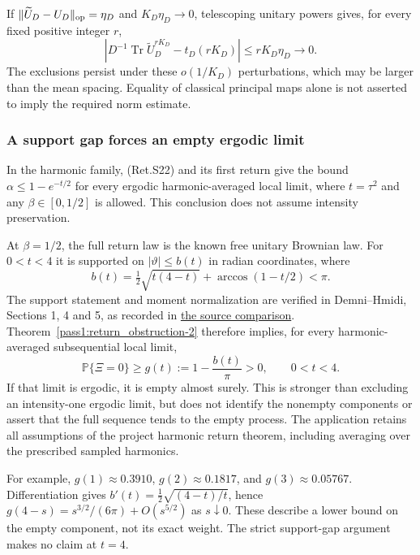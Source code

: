 If \(\|\widetilde U_D-U_D\|_{\rm op}=\eta_D\) and \(K_D\eta_D\to0\), telescoping
unitary powers gives, for every fixed positive integer \(r\),
\[
 |D^{-1}\operatorname{Tr}\widetilde U_D^{rK_D}-t_D(rK_D)|
                            \le rK_D\eta_D\longrightarrow0.     \tag{Ret.S16}
\]
The exclusions persist under these \(o(1/K_D)\) perturbations, which may be
larger than the mean spacing. Equality of classical principal maps alone
is not asserted to imply the required norm estimate.

\hypertarget{a-support-gap-forces-an-empty-ergodic-limit}{%
\subsubsection{A support gap forces an empty ergodic limit}\label{a-support-gap-forces-an-empty-ergodic-limit}}

In the harmonic family, (Ret.S22) and its first return give the bound
\(\alpha\le1-e^{-t/2}\) for every ergodic harmonic-averaged local limit,
where \(t=\tau^2\) and any \(\beta\in[0,1/2]\) is allowed.
This conclusion does not assume intensity preservation.

At \(\beta=1/2\), the full return law is the known free unitary Brownian law.
For \(0<t<4\) it is supported on \(|\vartheta|\le b(t)\) in radian coordinates,
where
\[
 b(t)=\tfrac12\sqrt{t(4-t)}+\arccos(1-t/2)<\pi.
\]
The support statement and moment normalization are verified in Demni--Hmidi,
Sections 1, 4 and 5, as recorded in
\href{https://github.com/ChurilovMaksim/BGS/blob/main/literature/return_local_limits_sources.md}{the source comparison}.
Theorem~\ref{pass1:return_obstruction-2} therefore implies, for every harmonic-averaged subsequential
local limit,
\[
 \mathbb P\{\Xi=0\}\ge
       g(t):=1-\frac{b(t)}{\pi}>0,\qquad 0<t<4.                 \tag{Ret.S24}
\]
If that limit is ergodic, it is empty almost surely. This is stronger than
excluding an intensity-one ergodic limit, but does not identify the
nonempty components or assert that the full sequence tends to the empty
process. The application retains all assumptions of the project harmonic
return theorem, including averaging over the prescribed sampled harmonics.

For example, \(g(1)\approx0.3910\), \(g(2)\approx0.1817\), and
\(g(3)\approx0.05767\). Differentiation gives
\(b'(t)=\tfrac12\sqrt{(4-t)/t}\), hence
\(g(4-s)=s^{3/2}/(6\pi)+O(s^{5/2})\) as \(s\downarrow0\).
These describe a lower bound on the empty component, not its exact weight.
The strict support-gap argument makes no claim at \(t=4\).

